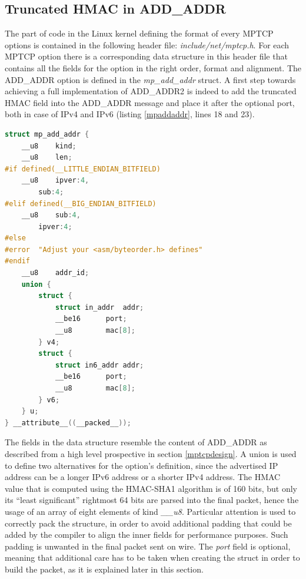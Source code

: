 \subsection{Truncated HMAC in ADD\_ADDR}
\label{hmacinaddaddr}
The part of code in the Linux kernel defining the format of every MPTCP options is contained in the following header file: \textit{include/net/mptcp.h}. For each MPTCP option there is a corresponding data structure in this header file that contains all the fields for the option in the right order, format and alignment. The ADD\_ADDR option is defined in the \textit{mp\_add\_addr} struct. A first step towards achieving a full implementation of ADD\_ADDR2 is indeed to add the truncated HMAC field into the ADD\_ADDR message and place it after the optional port, both in case of IPv4 and IPv6 (listing \ref{mpaddaddr}, lines 18 and 23).

\begin{lstlisting}[language=c, caption=\textit{mp\_add\_addr struct in the kernel}, label=mpaddaddr]
struct mp_add_addr {
	__u8	kind;
	__u8	len;
#if defined(__LITTLE_ENDIAN_BITFIELD)
	__u8	ipver:4,
		sub:4;
#elif defined(__BIG_ENDIAN_BITFIELD)
	__u8	sub:4,
		ipver:4;
#else
#error	"Adjust your <asm/byteorder.h> defines"
#endif
	__u8	addr_id;
	union {
		struct {
			struct in_addr	addr;
			__be16		port;
			__u8		mac[8];
		} v4;
		struct {
			struct in6_addr	addr;
			__be16		port;
			__u8		mac[8];
		} v6;
	} u;
} __attribute__((__packed__));
\end{lstlisting}

The fields in the data structure resemble the content of ADD\_ADDR as described from a high level prospective in section \ref{mptcpdesign}. 
A union is used to define two alternatives for the option's definition, since the advertised IP address can be a longer IPv6 address or a shorter IPv4 address. 
The HMAC value that is computed using the HMAC-SHA1 algorithm is of 160 bits, but only its ``least significant'' rightmost 64 bits are parsed into the final packet, hence the usage of an array of eight elements of kind \textit{\_\_u8}.
Particular attention is used to correctly pack the structure, in order to avoid additional padding that could be added by the compiler to align the inner fields for performance purposes. Such padding is unwanted in the final packet sent on wire. The \textit{port} field is optional, meaning that additional care has to be taken when creating the struct in order to build the packet, as it is explained later in this section.

